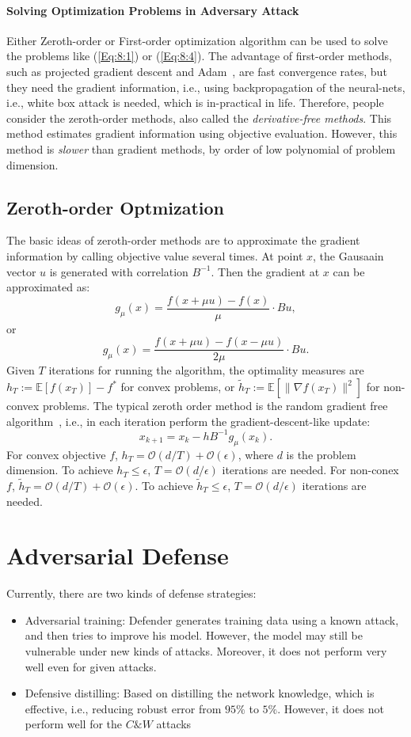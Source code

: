 \paragraph{Solving Optimization Problems in Adversary Attack}
Either Zeroth-order or First-order optimization algorithm can be used to solve the problems like (\ref{Eq:8:1}) or (\ref{Eq:8:4}). 
The advantage of first-order methods, such as projected gradient descent and Adam~\citep{kingma-adam}, are fast convergence rates, but they need the gradient information, i.e., using backpropagation of the neural-nets, i.e., white box attack is needed, which is in-practical in life. 
Therefore, people consider the zeroth-order methods, also called the \emph{derivative-free methods}.
This method estimates gradient information using objective evaluation. However, this method is \emph{slower} than gradient methods, by order of low polynomial of problem dimension.

\subsection{Zeroth-order Optmization}
The basic ideas of zeroth-order methods are to approximate the gradient information by calling objective value several times.
At point $x$, the Gausaain vector $u$ is generated with correlation $B^{-1}$.
Then the gradient at $x$ can be approximated as:
\[
g_\mu(x) = \frac{f(x+\mu u) - f(x)}{\mu} \cdot Bu,
\]
or
\[
\hat{g}_\mu(x) = \frac{f(x+\mu u) - f(x-\mu u)}{2\mu}\cdot Bu.
\]
Given $T$ iterations for running the algorithm, the optimality measures are $h_T:=\mathbb{E}[f(x_T)] - f^*$ for convex problems, or $\tilde{h}_T:=\mathbb{E}[\|\nabla f(x_T)\|^2]$ for non-convex problems.
The typical zeroth order method is the random gradient free algorithm~\citep{Nesterov2011}, i.e., in each iteration perform the gradient-descent-like update:
\[
x_{k+1} = x_k - hB^{-1}g_\mu(x_k).
\]
For convex objective $f$, $h_T=\mathcal{O}(d/T) + \mathcal{O}(\epsilon)$, where $d$ is the problem dimension. To achieve $h_T\le\epsilon$, $T=\mathcal{O}(d/\epsilon)$ iterations are needed.
For non-conex $f$, $\tilde{h}_T=\mathcal{O}(d/T) + \mathcal{O}(\epsilon)$.
To achieve $\tilde{h}_T\le\epsilon$, $T=\mathcal{O}(d/\epsilon)$ iterations are needed.


\section{Adversarial Defense}
Currently, there are two kinds of defense strategies:
\begin{itemize}
\item
Adversarial training: Defender generates training data using a known attack, and then tries to improve his model. 
However, the model may still be vulnerable under new kinds of attacks. 
Moreover, it does not perform very well even for given attacks.
\item
Defensive distilling: 
Based on distilling the network knowledge, which is effective, i.e.,  reducing robust error from $95\%$ to $5\%$. However, it does not perform well for the $C\& W$ attacks
\end{itemize}
